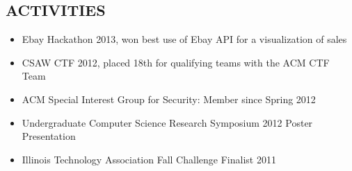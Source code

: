 \documentclass[margin]{res}
\begin{document}
\begin{resume}
\section{ACTIVITIES}
\begin{itemize} \itemsep -2pt
\item Ebay Hackathon 2013, won best use of Ebay API for a
  visualization of sales
\item CSAW CTF 2012, placed 18th for qualifying teams with the ACM CTF Team
\item ACM Special Interest Group for Security: Member since Spring 2012
\item Undergraduate Computer Science Research Symposium 2012 Poster Presentation
\item Illinois Technology Association Fall Challenge Finalist 2011
\end{itemize}
\end{resume}
\end{document}
